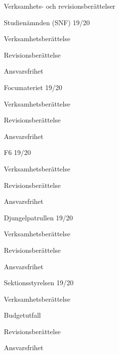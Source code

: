 \documentclass{../sektionsmote} %
\begin{document}
\begin{ootd}
\item{Verksamhets- och revisionsberättelser}
\begin{ootd}
    \item Studienämnden (SNF) 19/20
    \begin{ootd}
        \item Verksamhetsberättelse
        \item Revisionsberättelse
        \item Ansvarsfrihet
    \end{ootd}
\end{ootd}
\begin{ootd}
    \item Focumateriet 19/20
    \begin{ootd}
        \item Verksamhetsberättelse
        \item Revisionsberättelse
        \item Ansvarsfrihet
    \end{ootd}
\end{ootd}
\begin{ootd}
    \item F6 19/20
    \begin{ootd}
        \item Verksamhetsberättelse
        \item Revisionsberättelse
        \item Ansvarsfrihet
    \end{ootd}
\end{ootd}
\begin{ootd}
    \item Djungelpatrullen 19/20
    \begin{ootd}
        \item Verksamhetsberättelse
        \item Revisionsberättelse
        \item Ansvarsfrihet
    \end{ootd}
\end{ootd}
\begin{ootd}
    \item Sektionsstyrelsen 19/20
    \begin{ootd}
        \item Verksamhetsberättelse
        \item Budgetutfall
        \item Revisionsberättelse
        \item Ansvarsfrihet
    \end{ootd}
\end{ootd}


\end{ootd}
\end{document}

